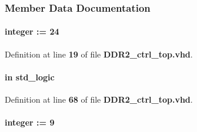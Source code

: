 \subsubsection{Member Data Documentation}
\paragraph[{addr\+\_\+size}]{ {\bfseries \textcolor{vhdlchar}{ }} {\bfseries \textcolor{comment}{integer}\textcolor{vhdlchar}{ }\textcolor{vhdlchar}{ }\textcolor{vhdlchar}{\+:}\textcolor{vhdlchar}{=}\textcolor{vhdlchar}{ }\textcolor{vhdlchar}{ } \textcolor{vhdldigit}{24} \textcolor{vhdlchar}{ }} \hspace{0.3cm}{\ttfamily [Generic]}}\label{classDDR2__ctrl__top_aafb0d946e5259c516e95eed0224fc8e6}


Definition at line {\bf 19} of file {\bf D\+D\+R2\+\_\+ctrl\+\_\+top.\+vhd}.

\paragraph[{begin\+\_\+test}]{ {\bfseries \textcolor{keywordflow}{in}\textcolor{vhdlchar}{ }} {\bfseries \textcolor{comment}{std\+\_\+logic}\textcolor{vhdlchar}{ }} \hspace{0.3cm}{\ttfamily [Port]}}\label{classDDR2__ctrl__top_a9762949045cae07c0a98ab427ba77ccb}


Definition at line {\bf 68} of file {\bf D\+D\+R2\+\_\+ctrl\+\_\+top.\+vhd}.

\paragraph[{cmd\+\_\+fifo\+\_\+size}]{ {\bfseries \textcolor{vhdlchar}{ }} {\bfseries \textcolor{comment}{integer}\textcolor{vhdlchar}{ }\textcolor{vhdlchar}{ }\textcolor{vhdlchar}{\+:}\textcolor{vhdlchar}{=}\textcolor{vhdlchar}{ }\textcolor{vhdlchar}{ } \textcolor{vhdldigit}{9} \textcolor{vhdlchar}{ }} \hspace{0.3cm}{\ttfamily [Generic]}}\label{classDDR2__ctrl__top_a971144df4148c6afc17e3f95866c9e3f}


